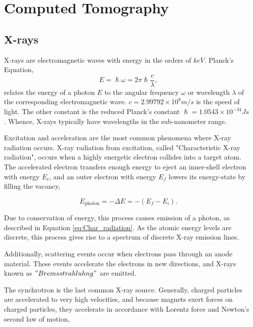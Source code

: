 
\chapter{Computed Tomography}

\section{X-rays}\label{sec:CT_Xrays}

X-rays are electromagnetic waves with energy in the orders of $keV$. Planck's Equation,
\begin{equation}\label{eq:Plancks_eq}
    E = \hslash \omega = 2\pi \hslash \frac{c}{\lambda},
\end{equation}
\noindent
relates the energy of a photon $E$ to the angular frequency $\omega$ or wavelength $\lambda$ of the corresponding electromagnetic wave.
$c = 2.99792 \times 10^8 m/s$ is the speed of light.
The other constant is the reduced Planck's constant $\hslash = 1.0543 \times 10^{-34} Js$  \cite{blokhin1961physics}.
Whence, X-rays typically have wavelengths in the sub-nanometer range.


Excitation and acceleration are the most common phenomena where X-ray radiation occurs.
X-ray radiation from excitation, called "Characteristic X-ray radiation", occurs when a highly energetic electron collides into a target atom.
The accelerated electron transfers enough energy to eject an inner-shell electron with energy $E_i$,
and an outer electron with energy $E_f$ lowers its energy-state by filling the vacancy,

\begin{equation}\label{eq:Char_radiation}
    E_{\mathrm{photon}} = - \Delta E = - (E_f - E_i).
\end{equation}

Due to conservation of energy, this process causes emission of a photon, as described in Equation \eqref{eq:Char_radiation}.
As the atomic energy levels are discrete, this process gives rise to a spectrum of discrete X-ray emission lines.


Additionally, scattering events occur when electrons pass through an anode material.
These events accelerate the electrons in new directions, and X-rays known as $"Bremsstrahluhng"$ are emitted. %

The synchrotron is the last common X-ray source.
Generally, charged particles are accelerated to very high velocities, and because magnets exert forces on charged particles, they accelerate in accordance with
Lorentz force and Newton's second law of motion,

